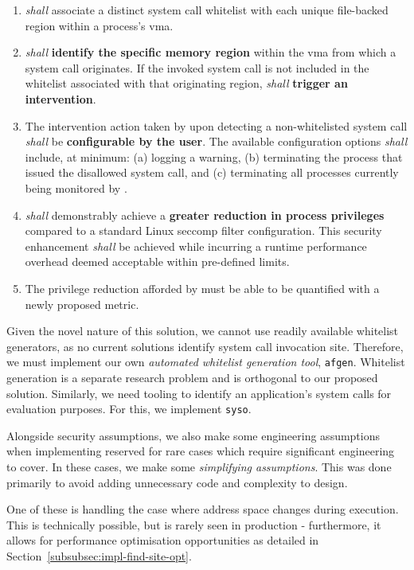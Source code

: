 \begin{enumerate}
    \item \af \textit{shall} associate a distinct system call whitelist with each unique file-backed region within a process's \ac{vma}.
    \item \af \textit{shall} \textbf{identify the specific memory region} within the \ac{vma} from which a system call originates. If the invoked system call is not included in the whitelist associated with that originating region, \af \textit{shall} \textbf{trigger an intervention}.
    \item The intervention action taken by \af upon detecting a non-whitelisted system call \textit{shall} be \textbf{configurable by the user}. The available configuration options \textit{shall} include, at minimum: (a) logging a warning, (b) terminating the process that issued the disallowed system call, and (c) terminating all processes currently being monitored by \af.
    \item \af \textit{shall} demonstrably achieve a \textbf{greater reduction in process privileges} compared to a standard Linux seccomp filter configuration. This security enhancement \textit{shall} be achieved while incurring a runtime performance overhead deemed acceptable within pre-defined limits.
    \item The privilege reduction afforded by \af must be able to be quantified
        with a newly proposed metric.
\end{enumerate}

Given the novel nature of this solution, we cannot use readily available
whitelist generators, as no current solutions identify system call
invocation site. Therefore, we must implement our own \textit{automated whitelist 
generation tool}, \texttt{afgen}. Whitelist generation is a separate research problem and is
orthogonal to our proposed solution. Similarly, we need tooling to identify an
application's system calls for evaluation purposes. For this, we implement
\texttt{syso}.




Alongside security assumptions, we also make some engineering assumptions when
implementing \af reserved for rare cases which require significant
engineering to cover. In these cases, we make some \textit{simplifying
assumptions}. This was done primarily to avoid adding unnecessary code and 
complexity to \afg design. 
 
One of these is handling the case where  address space changes during
execution. This is technically possible, but is rarely seen in production -
furthermore, it allows for performance optimisation opportunities as detailed in
Section~\ref{subsubsec:impl-find-site-opt}.

